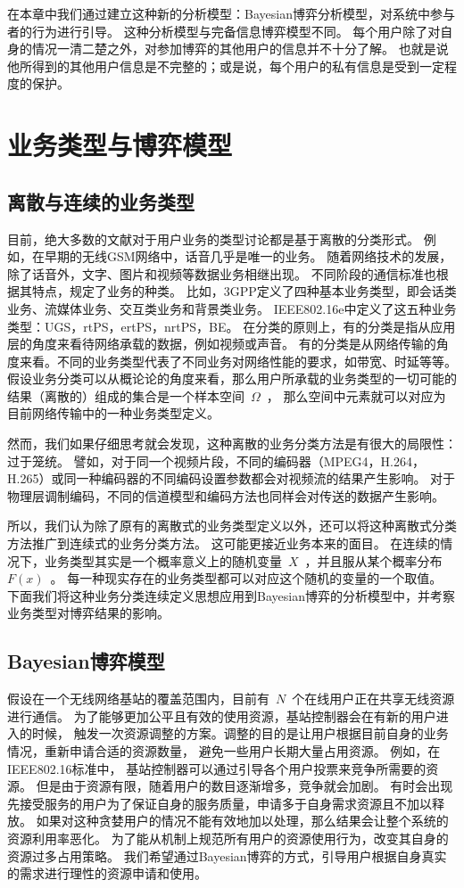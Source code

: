 在本章中我们通过建立这种新的分析模型：Bayesian博弈分析模型，对系统中参与者的行为进行引导。
这种分析模型与完备信息博弈模型不同。
每个用户除了对自身的情况一清二楚之外，对参加博弈的其他用户的信息并不十分了解。
也就是说他所得到的其他用户信息是不完整的；或是说，每个用户的私有信息是受到一定程度的保护。

\section{业务类型与博弈模型}
\subsection{离散与连续的业务类型}
目前，绝大多数的文献对于用户业务的类型讨论都是基于离散的分类形式。
例如，在早期的无线GSM网络中，话音几乎是唯一的业务。
随着网络技术的发展，除了话音外，文字、图片和视频等数据业务相继出现。
不同阶段的通信标准也根据其特点，规定了业务的种类。
比如，3GPP定义了四种基本业务类型，即会话类业务、流媒体业务、交互类业务和背景类业务。
IEEE802.16e中定义了这五种业务类型：UGS，rtPS，ertPS，nrtPS，BE。
在分类的原则上，有的分类是指从应用层的角度来看待网络承载的数据，例如视频或声音。
有的分类是从网络传输的角度来看。不同的业务类型代表了不同业务对网络性能的要求，如带宽、时延等等。
假设业务分类可以从概论论的角度来看，那么用户所承载的业务类型的一切可能的结果（离散的）组成的集合是一个样本空间~$\Omega$~，
那么空间中元素就可以对应为目前网络传输中的一种业务类型定义。

然而，我们如果仔细思考就会发现，这种离散的业务分类方法是有很大的局限性：过于笼统。
譬如，对于同一个视频片段，不同的编码器（MPEG4，H.264，H.265）或同一种编码器的不同编码设置参数都会对视频流的结果产生影响。
对于物理层调制编码，不同的信道模型和编码方法也同样会对传送的数据产生影响。

所以，我们认为除了原有的离散式的业务类型定义以外，还可以将这种离散式分类方法推广到连续式的业务分类方法。
这可能更接近业务本来的面目。
在连续的情况下，业务类型其实是一个概率意义上的随机变量~$X$~，并且服从某个概率分布~$F(x)$~。
每一种现实存在的业务类型都可以对应这个随机的变量的一个取值。
下面我们将这种业务分类连续定义思想应用到Bayesian博弈的分析模型中，并考察业务类型对博弈结果的影响。

\subsection{Bayesian博弈模型}
假设在一个无线网络基站的覆盖范围内，目前有~$N$~个在线用户正在共享无线资源进行通信。
为了能够更加公平且有效的使用资源，基站控制器会在有新的用户进入的时候，
触发一次资源调整的方案。调整的目的是让用户根据目前自身的业务情况，重新申请合适的资源数量，
避免一些用户长期大量占用资源。
例如，在IEEE802.16标准中，
基站控制器可以通过引导各个用户投票来竞争所需要的资源。
但是由于资源有限，随着用户的数目逐渐增多，竞争就会加剧。
有时会出现先接受服务的用户为了保证自身的服务质量，申请多于自身需求资源且不加以释放。
如果对这种贪婪用户的情况不能有效地加以处理，那么结果会让整个系统的资源利用率恶化。
为了能从机制上规范所有用户的资源使用行为，改变其自身的资源过多占用策略。
我们希望通过Bayesian博弈的方式，引导用户根据自身真实的需求进行理性的资源申请和使用。

